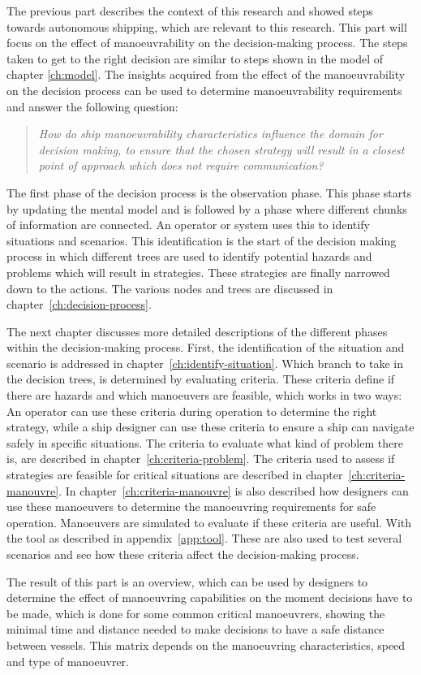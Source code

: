 The previous part describes the context of this research and showed steps towards autonomous shipping, which are relevant to this research. This part will focus on the effect of manoeuvrability on the decision-making process. The steps taken to get to the right decision are similar to steps shown in the model of chapter \ref{ch:model}. The insights acquired from the effect of the manoeuvrability on the decision process can be used to determine manoeuvrability requirements and answer the following question:

\begin{quotation}
	\emph{How do ship manoeuvrability characteristics influence the domain for decision making, to ensure that the chosen strategy will result in a closest point of approach which does not require communication?} 
\end{quotation}

The first phase of the decision process is the observation phase. This phase starts by updating the mental model and is followed by a phase where different chunks of information are connected. An operator or system uses this to identify situations and scenarios. This identification is the start of the decision making process in which different trees are used to identify potential hazards and problems which will result in strategies. These strategies are finally narrowed down to the actions. The various nodes and trees are discussed in chapter~\ref{ch:decision-process}. 

The next chapter discusses more detailed descriptions of the different phases within the decision-making process. First, the identification of the situation and scenario is addressed in chapter~\ref{ch:identify-situation}.
Which branch to take in the decision trees, is determined by evaluating criteria. These criteria define if there are hazards and which manoeuvers are feasible, which works in two ways: An operator can use these criteria during operation to determine the right strategy, while a ship designer can use these criteria to ensure a ship can navigate safely in specific situations. The criteria to evaluate what kind of problem there is, are described in chapter~\ref{ch:criteria-problem}. The criteria used to assess if strategies are feasible for critical situations are described in chapter~\ref{ch:criteria-manouvre}. In chapter~\ref{ch:criteria-manouvre} is also described how designers can use these manoeuvers to determine the manoeuvring requirements for safe operation. Manoeuvers are simulated to evaluate if these criteria are useful. With the tool as described in appendix~\ref{app:tool}. These are also used to test several scenarios and see how these criteria affect the decision-making process.

The result of this part is an overview, which can be used by designers to determine the effect of manoeuvring capabilities on the moment decisions have to be made, which is done for some common critical manoeuvrers, showing the minimal time and distance needed to make decisions to have a safe distance between vessels. This matrix depends on the manoeuvring characteristics, speed and type of manoeuvrer.